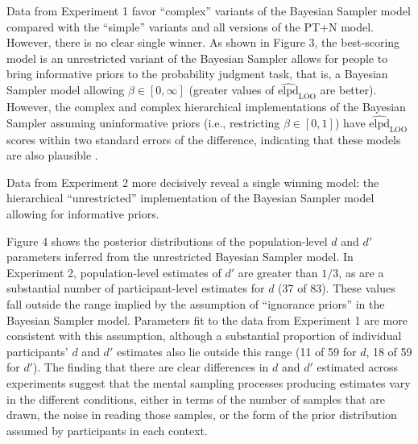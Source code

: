 \documentclass[
  english,
  man,floatsintext]{apa6}
\begin{document}
Data from Experiment 1 favor ``complex'' variants of the Bayesian Sampler model compared with the ``simple'' variants and all versions of the PT+N model. However, there is no clear single winner. As shown in Figure 3, the best-scoring model is an unrestricted variant of the Bayesian Sampler allows for people to bring informative priors to the probability judgment task, that is, a Bayesian Sampler model allowing \(\beta \in [0, \infty]\) (greater values of \(\widehat{\text{elpd}}_{\text{LOO}}\) are better). However, the complex and complex hierarchical implementations of the Bayesian Sampler assuming uninformative priors (i.e., restricting \(\beta \in [0,1]\)) have \(\widehat{\text{elpd}}_{\text{LOO}}\) scores within two standard errors of the difference, indicating that these models are also plausible \autocite{sivula.etal2020}.

Data from Experiment 2 more decisively reveal a single winning model: the hierarchical ``unrestricted'' implementation of the Bayesian Sampler model allowing for informative priors.

Figure 4 shows the posterior distributions of the population-level \(d\) and \(d'\) parameters inferred from the unrestricted Bayesian Sampler model. In Experiment 2, population-level estimates of \(d'\) are greater than \(1/3\), as are a substantial number of participant-level estimates for \(d\) (37 of 83). These values fall outside the range implied by the assumption of ``ignorance priors'' in the Bayesian Sampler model. Parameters fit to the data from Experiment 1 are more consistent with this assumption, although a substantial proportion of individual participants' \(d\) and \(d'\) estimates also lie outside this range (11 of 59 for \(d\), 18 of 59 for \(d'\)). The finding that there are clear differences in \(d\) and \(d'\) estimated across experiments suggest that the mental sampling processes producing estimates vary in the different conditions, either in terms of the number of samples that are drawn, the noise in reading those samples, or the form of the prior distribution assumed by participants in each context.
\end{document}
